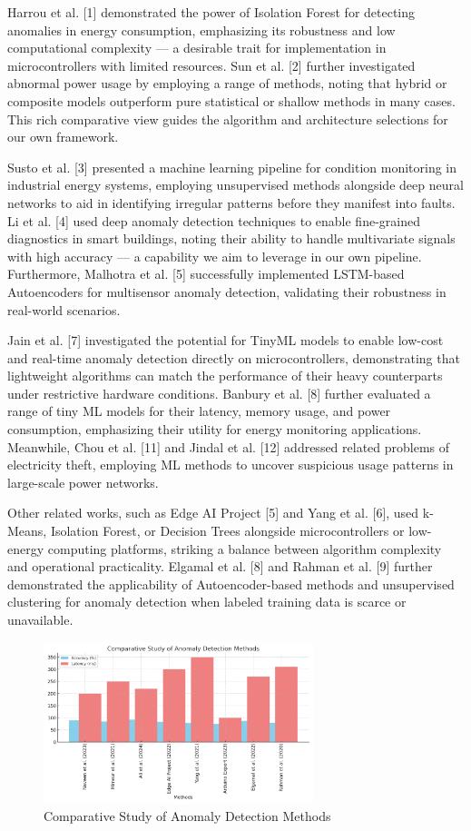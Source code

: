 \documentclass[12pt, draftclsnofoot, onecolumn]{IEEEtran}
\begin{document}
Harrou et al. [1] demonstrated the power of Isolation Forest for detecting anomalies in energy consumption, emphasizing its robustness and low computational complexity — a desirable trait for implementation in microcontrollers with limited resources. Sun et al. [2] further investigated abnormal power usage by employing a range of methods, noting that hybrid or composite models outperform pure statistical or shallow methods in many cases. This rich comparative view guides the algorithm and architecture selections for our own framework.

Susto et al. [3] presented a machine learning pipeline for condition monitoring in industrial energy systems, employing unsupervised methods alongside deep neural networks to aid in identifying irregular patterns before they manifest into faults. Li et al. [4] used deep anomaly detection techniques to enable fine-grained diagnostics in smart buildings, noting their ability to handle multivariate signals with high accuracy — a capability we aim to leverage in our own pipeline. Furthermore, Malhotra et al. [5] successfully implemented LSTM-based Autoencoders for multisensor anomaly detection, validating their robustness in real-world scenarios.

Jain et al. [7] investigated the potential for TinyML models to enable low-cost and real-time anomaly detection directly on microcontrollers, demonstrating that lightweight algorithms can match the performance of their heavy counterparts under restrictive hardware conditions. Banbury et al. [8] further evaluated a range of tiny ML models for their latency, memory usage, and power consumption, emphasizing their utility for energy monitoring applications. Meanwhile, Chou et al. [11] and Jindal et al. [12] addressed related problems of electricity theft, employing ML methods to uncover suspicious usage patterns in large-scale power networks.

Other related works, such as Edge AI Project [5] and Yang et al. [6], used k-Means, Isolation Forest, or Decision Trees alongside microcontrollers or low-energy computing platforms, striking a balance between algorithm complexity and operational practicality. Elgamal et al. [8] and Rahman et al. [9] further demonstrated the applicability of Autoencoder-based methods and unsupervised clustering for anomaly detection when labeled training data is scarce or unavailable.

\begin{figure}[h!]
	\centering
	\includegraphics[width=0.7\textwidth]{comparative_graph.png}
	\caption{Comparative Study of Anomaly Detection Methods}
	\label{fig:comp-graph}
\end{figure}
\end{document}
